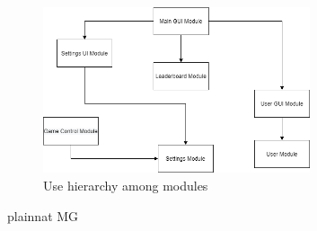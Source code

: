 \documentclass[12pt, titlepage]{article}
\begin{document}



\begin{figure}[H]
\centering
\includegraphics[width=0.7\textwidth]{UsesHierarchy.png}
\caption{Use hierarchy among modules}
\label{FigUH}
\end{figure}


 {plainnat}
 {MG}
\end{document}
